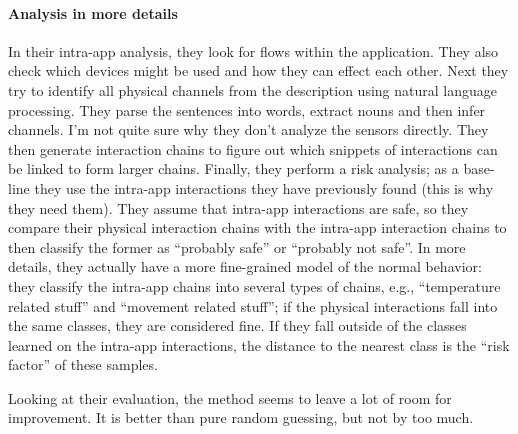 \documentclass{article}
\begin{document}
\paragraph{Analysis in more details}
In their intra-app analysis, they look for flows within the application. They also check which devices might be used and how they can effect each other.  Next they try to identify all physical channels from the description using natural language processing. They parse the sentences into words, extract nouns and then infer channels. I'm not quite sure why they don't analyze the sensors directly.
%
They then generate interaction chains to figure out which snippets of interactions can be linked to form larger chains.
 Finally, they perform a risk analysis; as a base-line they use the intra-app interactions they have previously found (this is why they need them). They assume that intra-app interactions are safe, so they compare their physical interaction chains with the intra-app interaction chains to then classify the former as ``probably safe'' or ``probably not safe''.
%
In more details, they actually have a more fine-grained model of the normal behavior: they classify the intra-app chains into several types of chains, e.g., ``temperature related stuff'' and ``movement related stuff''; if the physical interactions fall into the same classes, they are considered fine. If they fall outside of the classes learned on the intra-app interactions, the distance to the nearest class is the ``risk factor'' of these samples.

Looking at their evaluation, the method seems to leave a lot of room for improvement. It is better than pure random guessing, but not by too much.



\end{document}
